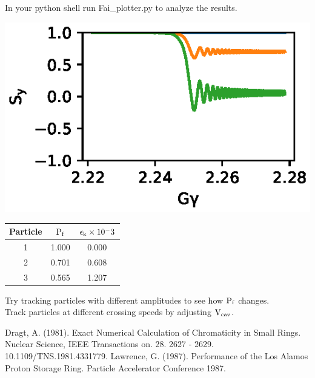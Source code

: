 \documentclass{beamer}
\begin{document}
\begin{frame}
In your python shell run Fai\_plotter.py to analyze the results.
\hspace*{-2em}
\begin{minipage}{0.52\textwidth}
\includegraphics[scale=0.8]{PSR_SPNTRK.eps}
\end{minipage}
\begin{minipage}{0.48\textwidth}
\begin{tabular}{c|c|c}
Particle&$\rm P_f$&$\rm \epsilon_k\times 10^-3$\\
\hline
1&1.000&0.000\\
2&0.701&0.608\\
3&0.565&1.207\\
\end{tabular}
\end{minipage}
Try tracking particles with different amplitudes to see how $\rm P_f$ changes.\\
Track particles at different crossing speeds by adjusting $\rm V_{cav}$.
\end{frame}
\begin{thebibliography}{99}
 Dragt, A. (1981). Exact Numerical Calculation of Chromaticity in Small Rings. Nuclear Science, IEEE Transactions on. 28. 2627 - 2629. 10.1109/TNS.1981.4331779. 
 Lawrence, G. (1987). Performance of the Los Alamos Proton Storage Ring. Particle Accelerator Conference 1987.
\end{thebibliography}
\end{document}
